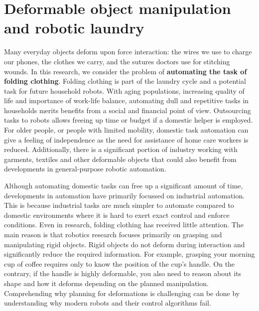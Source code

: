 \documentclass[\home/main.tex]{subfiles}
\begin{document}

\section{Deformable object manipulation and robotic laundry}
Many everyday objects deform upon force interaction: the wires we use to charge our phones, the clothes we carry, and the sutures doctors use for stitching wounds.
In this research, we consider the problem of \textbf{automating the task of folding clothing}. Folding clothing is part of the laundry cycle and a potential task for future household robots.
With aging populations, increasing quality of life and importance of work-life balance, automating dull and repetitive tasks in households merits benefits from a social and financial point of view. Outsourcing tasks to robots allows freeing up time or budget if a domestic helper is employed. For older people, or people with limited mobility, domestic task automation can give a feeling of independence as the need for assistance of home care workers is reduced.
Additionally, there is a significant portion of industry working with garments, textiles and other deformable objects that could also benefit from developments in general-purpose robotic automation.

Although automating domestic tasks can free up a significant amount of time, developments in automation have primarily focussed on industrial automation. This is because industrial tasks are much simpler to automate compared to domestic environments where it is hard to exert exact control and enforce conditions. Even in research, folding clothing has received little attention. The main reason is that robotics research focuses primarily on grasping and manipulating rigid objects. Rigid objects do not deform during interaction and significantly reduce the required information. For example, grasping your morning cup of coffee requires only to know the position of the cup's handle.
On the contrary, if the handle is highly deformable, you also need to reason about its shape and how it deforms depending on the planned manipulation.
Comprehending why planning for deformations is challenging can be done by understanding why modern robots and their control algorithms fail.
\end{document}
